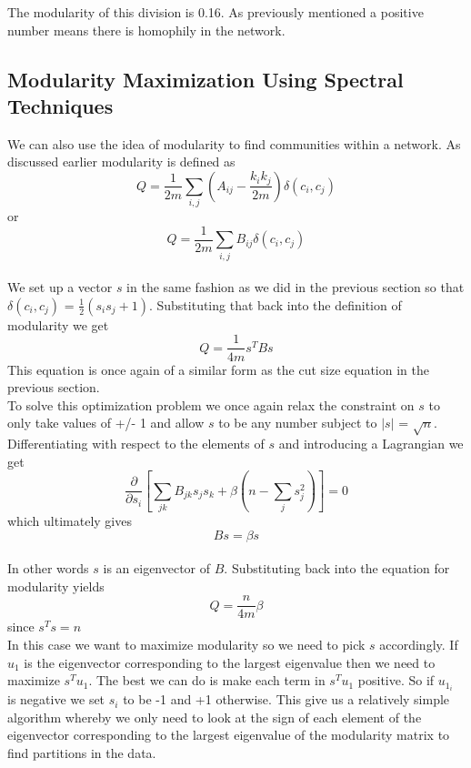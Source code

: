 \documentclass[12pt]{article}
\begin{document}
	The modularity of this division is 0.16. As previously mentioned a positive number means there is homophily in the network. 
	
	\subsection{Modularity Maximization Using Spectral Techniques} 
	We can also use the idea of modularity to find communities within a network. As discussed earlier modularity is defined as 
	\begin{equation}
		Q = \frac{1}{2m} \sum_{i,j} \left( A_{ij} - \frac{k_i k_j}{2m} \right) \delta (c_i,c_j)
	\end{equation}
	or
	\begin{equation}
		Q = \frac{1}{2m} \sum_{i,j} B_{ij} \delta (c_i,c_j)
	\end{equation}
	\\
	We set up a vector $s$ in the same fashion as we did in the previous section so that $\delta (c_i,c_j)$ = $\frac{1}{2} (s_i s_j + 1)$. Substituting that back into the definition of modularity we get
	\begin{equation}
		Q = \frac{1}{4m} s^T B s
	\end{equation}
	This equation is once again of a similar form as the cut size equation in the previous section. 
	\\
	To solve this optimization problem we once again relax the constraint on $s$ to only take values of +/- 1 and allow $s$ to be any number subject to $|s|$ = $\sqrt{n}$. Differentiating with respect to the elements of $s$ and introducing a Lagrangian we get
	\begin{equation}
		\frac{\partial}{\partial s_i} 
			\left[ 
			\sum_{jk} B_{jk} s_j s_k 
			+ \beta \left( n - \sum_j s_j^2 \right)
			\right] = 0
	\end{equation}
	which ultimately gives
	\begin{equation}
		B s = \beta s
	\end{equation}
	\\
	In other words $s$ is an eigenvector of $B$. Substituting back into the equation for modularity yields
	\begin{equation}
		Q = \frac{n}{4m} \beta
	\end{equation}
	since $s^T s = n$
	\\
	
	In this case we want to maximize modularity so we need to pick $s$ accordingly. If $u_1$ is the eigenvector corresponding to the largest eigenvalue then we need to maximize $s^T u_1$. The best we can do is make each term in $s^T u_1$ positive. So if $u_{1_i}$ is negative we set $s_i$ to be -1 and +1 otherwise. This give us a relatively simple algorithm whereby we only need to look at the sign of each element of the eigenvector corresponding to the largest eigenvalue of the modularity matrix to find partitions in the data. 
	
\end{document}
